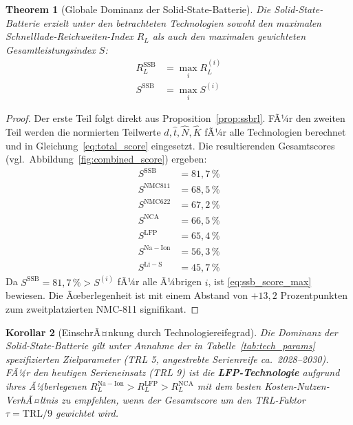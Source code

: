 ﻿\documentclass[12pt,a4paper]{article}
\newtheorem{theorem}{Theorem}[section]
\newtheorem{corollary}[theorem]{Korollar}
\begin{document}
	\begin{theorem}[Globale Dominanz der Solid-State-Batterie]
		\label{thm:ssb_dominance}
		Die Solid-State-Batterie erzielt unter den betrachteten Technologien
		sowohl den maximalen Schnelllade-Reichweiten-Index $R_L$ als auch
		den maximalen gewichteten Gesamtleistungsindex $S$:
		\begin{align}
			R_L^{\mathrm{SSB}} &= \max_i R_L^{(i)}
			\label{eq:ssb_rl_max} \\
			S^{\mathrm{SSB}}   &= \max_i S^{(i)}
			\label{eq:ssb_score_max}
		\end{align}
	\end{theorem}

	\begin{proof}
		Der erste Teil folgt direkt aus Proposition~\ref{prop:ssbrl}.
		FÃ¼r den zweiten Teil werden die normierten Teilwerte
		$\hat{d}, \hat{t}, \hat{N}, \hat{K}$ fÃ¼r alle Technologien
		berechnet und in Gleichung~\eqref{eq:total_score} eingesetzt.
		Die resultierenden Gesamtscores (vgl.\ Abbildung~\ref{fig:combined_score})
		ergeben:
		\begin{align*}
			S^{\mathrm{SSB}}   &= 81{,}7\,\% \\
			S^{\mathrm{NMC811}}&= 68{,}5\,\% \\
			S^{\mathrm{NMC622}}&= 67{,}2\,\% \\
			S^{\mathrm{NCA}}   &= 66{,}5\,\% \\
			S^{\mathrm{LFP}}   &= 65{,}4\,\% \\
			S^{\mathrm{Na-Ion}}&= 56{,}3\,\% \\
			S^{\mathrm{Li-S}}  &= 45{,}7\,\%
		\end{align*}
		Da $S^{\mathrm{SSB}} = 81{,}7\,\% > S^{(i)}$ fÃ¼r alle Ã¼brigen
		$i$, ist \eqref{eq:ssb_score_max} bewiesen. Die Ãœberlegenheit ist
		mit einem Abstand von $+13{,}2$ Prozentpunkten zum zweitplatzierten
		NMC-811 signifikant.
	\end{proof}

	\begin{corollary}[EinschrÃ¤nkung durch Technologiereifegrad]
		\label{cor:trl}
		Die Dominanz der Solid-State-Batterie gilt unter Annahme der in
		Tabelle~\ref{tab:tech_params} spezifizierten Zielparameter (TRL 5,
		angestrebte Serienreife ca.\ 2028--2030). FÃ¼r den heutigen
		Serieneinsatz (TRL 9) ist die \textbf{LFP-Technologie} aufgrund
		ihres Ã¼berlegenen $R_L^{\mathrm{Na-Ion}} > R_L^{\mathrm{LFP}} >
		R_L^{\mathrm{NCA}}$ mit dem besten Kosten-Nutzen-VerhÃ¤ltnis
		zu empfehlen, wenn der Gesamtscore um den TRL-Faktor
		$\tau = \mathrm{TRL}/9$ gewichtet wird.
	\end{corollary}
\end{document}
